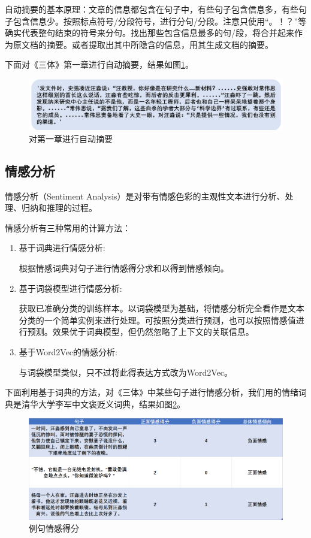 \documentclass[12pt]{xjtureport}
\begin{document}
自动摘要的基本原理：文章的信息都包含在句子中，有些句子包含信息多，有些句子包含信息少。按照标点符号/分段符号，进行分句/分段。注意只使用“。！？”等确实代表整句结束的符号来分句。找出那些包含信息最多的句/段，将合并起来作为原文档的摘要。或者提取出其中所隐含的信息，用其生成文档的摘要。

下面对《三体》第一章进行自动摘要，结果如图\ref{abstract}。
\begin{figure}[!htbp]
    \centering
    \includegraphics[width=\linewidth]{figures/自动摘要.png}
    \caption{对第一章进行自动摘要}
    \label{abstract}
\end{figure}

\subsection{情感分析}

情感分析（Sentiment Analysis）是对带有情感色彩的主观性文本进行分析、处理、归纳和推理的过程。

情感分析有三种常用的计算方法：

\begin{enumerate}
    \item 基于词典进行情感分析:
    
    根据情感词典对句子进行情感得分求和以得到情感倾向。

    \item 基于词袋模型进行情感分析:
    
    获取已准确分类的训练样本。以词袋模型为基础，将情感分析完全看作是文本分类的一个简单实例来进行处理。可按照分类进行预测，也可以按照情感值进行预测。效果优于词典模型，但仍然忽略了上下文的关联信息。

    \item 基于Word2Vec的情感分析:
    
    与词袋模型类似，只不过将此得表达方式改为Word2Vec。

\end{enumerate}

下面利用基于词典的方法，对《三体》中某些句子进行情感分析，我们用的情绪词典是清华大学李军中文褒贬义词典，结果如图\ref{score}。

\begin{figure}[b]
    \centering
    \includegraphics[width=0.9\linewidth]{figures/情感得分.jpg}
    \caption{例句情感得分}
    \label{score}
\end{figure}
\end{document}
